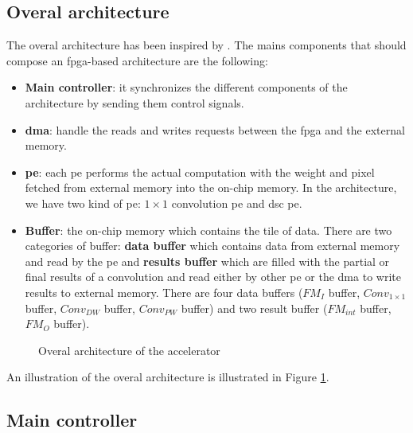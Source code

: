 \subsection{Overal architecture} \label{subsec:overal}
%
The overal architecture has been inspired by \textcite{zhu_efficient_2020}. The mains components that should compose an \acrshort{fpga}-based architecture are the following:
%
\begin{itemize}
    \item \textbf{Main controller}: it synchronizes the different components of the architecture by sending them control signals.
    \item \textbf{\acrfull{dma}}: handle the reads and writes requests between the \acrshort{fpga} and the external memory.
    \item \textbf{\acrshort{pe}}: each \acrshort{pe} performs the actual computation with the weight and pixel fetched from external memory into the on-chip memory. In the architecture, we have two kind of \acrshort{pe}: $1 \times 1$ convolution \acrshort{pe} and \acrshort{dsc} pe.
    \item \textbf{Buffer}: the on-chip memory which contains the tile of data. There are two categories of buffer: \textbf{data buffer} which contains data from external memory and read by the \acrshort{pe} and \textbf{results buffer} which are filled with the partial or final results of a convolution and read either by other \acrshort{pe} or the \acrshort{dma} to write results to external memory. There are four data buffers ($FM_{I}$ buffer, $Conv_{1 \times 1}$ buffer, $Conv_{DW}$ buffer, $Conv_{PW}$ buffer) and two result buffer ($FM_{int}$ buffer, $FM_{O}$ buffer).
\end{itemize}
%
\begin{figure}
    \centering
    \caption{Overal architecture of the accelerator}
    \label{fig:overal_archi}
\end{figure}
%
An illustration of the overal architecture is illustrated in Figure \ref{fig:overal_archi}.
%
\subsection{Main controller}

